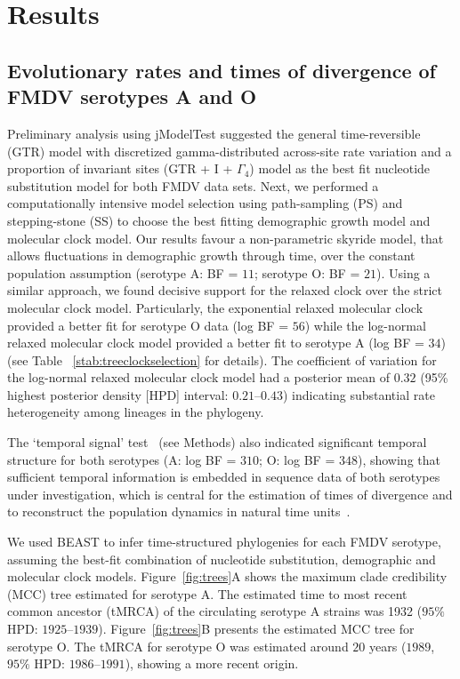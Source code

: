 \documentclass[10pt]{article}
\begin{document}
\section*{Results}

\subsection*{Evolutionary rates and times of divergence of FMDV serotypes A and O}

Preliminary analysis using jModelTest suggested the general time-reversible (GTR) model with discretized gamma-distributed across-site rate variation and a proportion of invariant sites (GTR + I + $\Gamma_{4}$) model as the best fit nucleotide substitution model for both FMDV data sets.
Next, we performed a computationally intensive model selection using path-sampling (PS) and stepping-stone (SS) to choose the best fitting demographic growth model and molecular clock model.
Our results favour a non-parametric skyride model, that allows fluctuations in demographic growth through time, over the constant population assumption (serotype A: BF = $11$; serotype O: BF = $21$).
Using a similar approach, we  found decisive support for the relaxed clock over the strict molecular clock model.
Particularly, the exponential relaxed molecular clock provided a better fit for serotype O data (log BF = $56$) while the log-normal relaxed molecular clock model provided a better fit to serotype A (log BF = $34$) (see Table ~\ref{stab:treeclockselection} for details). 
The coefficient of variation for the log-normal relaxed molecular clock model had a posterior mean of $0.32$ (95\% highest posterior density [HPD] interval: $0.21$--$0.43$) indicating substantial rate heterogeneity among lineages in the phylogeny.

The `temporal signal' test~\cite{Faria2012} (see Methods) also indicated significant temporal structure for both serotypes (A: log BF = $310$; O: log BF = $348$), showing that sufficient temporal information is embedded in sequence data of both serotypes under investigation, which is central for the estimation of times of divergence and to reconstruct the population dynamics in natural time units~\cite{MEP}.

We used BEAST to infer time-structured phylogenies for each FMDV serotype, assuming the best-fit combination of nucleotide substitution, demographic and molecular clock models.
Figure~\ref{fig:trees}A shows the maximum clade credibility (MCC) tree estimated for serotype A.
The estimated time to most recent common ancestor (tMRCA) of the circulating serotype A strains was 1932 ($95\%$ HPD: $1925$--$1939$).
Figure~\ref{fig:trees}B presents the estimated MCC tree for serotype O.
The tMRCA for serotype O was estimated around $20$ years ($1989$, $95\%$ HPD: $ 1986$--$1991$), showing a more recent origin. 
\end{document}
